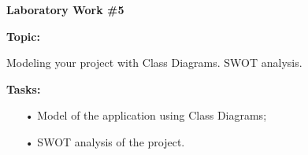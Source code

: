 \graphicspath{ {pic/} }
\begin{flushleft}
\setlength{\parindent}{2ex}\par
\textbf{Laboratory Work \#5} \par
\textbf{Topic:}\par
Modeling your project with Class Diagrams. SWOT analysis.\par
\textbf{Tasks:}
\begin{enumerate}
\item[•] Model of the application using Class Diagrams;
\item[•] SWOT analysis of the project.
\end{enumerate}
\end{flushleft}
\clearpage
